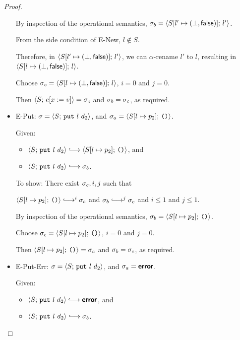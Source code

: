 \begin{proof}
\begin{itemize}
      By inspection of the operational semantics, $\sigma_b =
      \langle S[l' \mapsto (\bot, \textsf{false})];\, l' \rangle$.

      From the side condition of {\sc E-New}, $l \notin S$.

      Therefore, in $\langle S[l' \mapsto (\bot, \textsf{false})];\, l' \rangle$,
      we can $\alpha$-rename $l'$ to $l$, resulting in
      $\langle S[l \mapsto (\bot, \textsf{false})];\, l \rangle$.

      Choose $\sigma_c = \langle S[l \mapsto (\bot, \textsf{false})];\, l \rangle$,
      $i = 0$ and $j = 0$.

      Then $\langle S;\, e[x := v] \rangle = \sigma_c$ and $\sigma_b =
      \sigma_c$, as required.

    \item {\sc E-Put}: $\sigma = \langle S;\, \mbox{\texttt{put}}~l~d_2 \rangle$, and
      $\sigma_a = \langle S[l \mapsto p_2];\, \mbox{\texttt{()}} \rangle$.

      Given:
      \begin{itemize}
      \item $\config{S}{\putexp{l}{d_2}} \parstepsto
        \config{\extSRaw{S}{l}{p_2}}{\unit}$, and
      \item $\config{S}{\putexp{l}{d_2}} \parstepsto \conf_b$.
      \end{itemize}

      To show: There exist $\sigma_c, i, j$ such that

      $\config{\extSRaw{S}{l}{p_2}}{\unit} \parstepsto^i \conf_c$ and
      $\conf_b \parstepsto^j \conf_c$ and $i \leq 1$ and $j \leq 1$.

      By inspection of the operational semantics, $\sigma_b =
      \langle S[l \mapsto p_2];\, \mbox{\texttt{()}} \rangle$.

      Choose $\sigma_c = \langle S[l \mapsto p_2];\, \mbox{\texttt{()}} \rangle$, $i = 0$
      and $j = 0$.

      Then $\langle S[l \mapsto p_2];\, \mbox{\texttt{()}} \rangle = \sigma_c$ and $\sigma_b
      = \sigma_c$, as required.

    \item {\sc E-Put-Err}: $\sigma = \langle S;\, \mbox{\texttt{put}}~l~d_2 \rangle$, and
      $\sigma_a = \textbf{\textsf{error}}$.

      Given:
      \begin{itemize}
      \item $\config{S}{\putexp{l}{d_2}} \parstepsto \error$, and
      \item $\config{S}{\putexp{l}{d_2}} \parstepsto \conf_b$.
      \end{itemize}


\end{itemize}
\end{proof}
